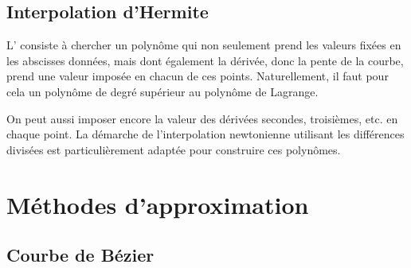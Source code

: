 \medskip
\subsection{Interpolation d'Hermite}

L' consiste à chercher 
un polynôme qui non seulement prend les valeurs fixées en les 
abscisses données, mais dont également la dérivée, donc la pente de la courbe, 
prend une valeur imposée en chacun de ces points. 
Naturellement, il faut pour cela un polynôme de degré supérieur au polynôme de Lagrange.

On peut aussi imposer encore la valeur des dérivées secondes, troisièmes, etc. en chaque point. 
La démarche de l'interpolation newtonienne 
utilisant les différences divisées est particulièrement adaptée pour construire ces polynômes.






\medskip
\section{Méthodes d'approximation}

\medskip
\subsection{Courbe de Bézier}

